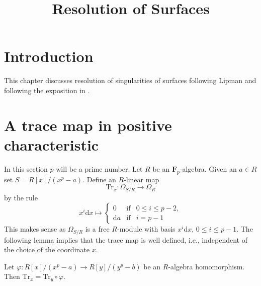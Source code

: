 

%


\title{Resolution of Surfaces}


\maketitle

\label{section-phantom}

\tableofcontents

\section{Introduction}
\label{section-introduction}

\noindent
This chapter discusses resolution of singularities of surfaces
following Lipman \cite{Lipman} and following the exposition
in \cite{Artin-Lipman}.





\section{A trace map in positive characteristic}
\label{section-trace}

\noindent
In this section $p$ will be a prime number. Let $R$ be an
$\mathbf{F}_p$-algebra. Given an $a \in R$ set $S = R[x]/(x^p - a)$.
Define an $R$-linear map
$$
\text{Tr}_x : \Omega_{S/R} \longrightarrow \Omega_R
$$
by the rule
$$
x^i\text{d}x \longmapsto
\left\{
\begin{matrix}
0 & \text{if} & 0 \leq i \leq p - 2, \\
\text{d}a & \text{if} & i = p - 1
\end{matrix}
\right.
$$
This makes sense as $\Omega_{S/R}$ is a free $R$-module with
basis $x^i\text{d}x$, $0 \leq i \leq p - 1$.
The following lemma implies that the trace map is well defined,
i.e., independent of the choice of the coordinate $x$.

\begin{lemma}
\label{lemma-trace-well-defined}
Let $\varphi : R[x]/(x^p - a) \to R[y]/(y^p - b)$ be an $R$-algebra
homomorphism. Then $\text{Tr}_x = \text{Tr}_y \circ \varphi$.
\end{lemma}

